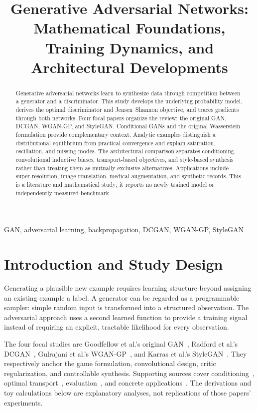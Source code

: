 \documentclass[conference]{IEEEtran}
\title{Generative Adversarial Networks: Mathematical Foundations, Training Dynamics, and Architectural Developments}
\author{\IEEEauthorblockN{Alaa Boghdady}\IEEEauthorblockA{Cellula AI Internship -- Week 8, Task 3}}
\begin{document}
\maketitle
\begin{abstract}
Generative adversarial networks learn to synthesize data through competition between a generator and a discriminator. This study develops the underlying probability model, derives the optimal discriminator and Jensen--Shannon objective, and traces gradients through both networks. Four focal papers organize the review: the original GAN, DCGAN, WGAN-GP, and StyleGAN. Conditional GANs and the original Wasserstein formulation provide complementary context. Analytic examples distinguish a distributional equilibrium from practical convergence and explain saturation, oscillation, and missing modes. The architectural comparison separates conditioning, convolutional inductive biases, transport-based objectives, and style-based synthesis rather than treating them as mutually exclusive alternatives. Applications include super-resolution, image translation, medical augmentation, and synthetic records. This is a literature and mathematical study; it reports no newly trained model or independently measured benchmark.
\end{abstract}
\begin{IEEEkeywords}
GAN, adversarial learning, backpropagation, DCGAN, WGAN-GP, StyleGAN
\end{IEEEkeywords}

\section{Introduction and Study Design}
Generating a plausible new example requires learning structure beyond assigning an existing example a label. A generator can be regarded as a programmable sampler: simple random input is transformed into a structured observation. The adversarial approach uses a second learned function to provide a training signal instead of requiring an explicit, tractable likelihood for every observation.

The four focal studies are Goodfellow et al.'s original GAN~\cite{gan}, Radford et al.'s DCGAN~\cite{dcgan}, Gulrajani et al.'s WGAN-GP~\cite{gp}, and Karras et al.'s StyleGAN~\cite{style}. They respectively anchor the game formulation, convolutional design, critic regularization, and controllable synthesis. Supporting sources cover conditioning~\cite{cgan}, optimal transport~\cite{wgan}, evaluation~\cite{fid}, and concrete applications~\cite{sr,pix,cycle,med,records}. The derivations and toy calculations below are explanatory analyses, not replications of those papers' experiments.
\end{document}
